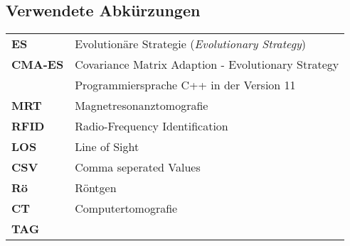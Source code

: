 \newpage
%
\subsection*{Verwendete Abkürzungen}
%
\begin{table} [H]
	\begin{center}
		\begin{tabular}{p{25mm}p{95mm}}
		      	\textbf{ES} & Evolutionäre Strategie (\textit{Evolutionary Strategy})\\
		      	\textbf{CMA-ES}  & Covariance Matrix Adaption - Evolutionary Strategy\\
		      	\textbf{\cpp11} & Programmiersprache C++ in der Version 11\\
		      	\textbf{MRT}	& Magnetresonanztomografie\\
		      	\textbf{RFID} & Radio-Frequency Identification\\
		      	\textbf{LOS} & Line of Sight\\
		      	\textbf{CSV} & Comma seperated Values\\
		      	\textbf{Rö} & Röntgen\\
		      	\textbf{CT} & Computertomografie\\
		      	\textbf{TAG} & \\
		      	
%		      	
		\end{tabular}
	\end{center}
\end{table}

